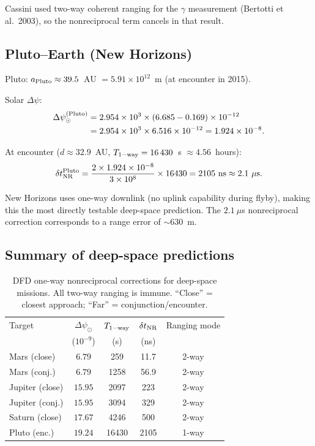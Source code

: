 \documentclass[aps,prl,twocolumn,superscriptaddress,showpacs]{revtex4-2}
\begin{document}
Cassini used two-way coherent ranging for the $\gamma$ measurement
(Bertotti et al.\ 2003), so the nonreciprocal term cancels in that
result.

\subsection{Pluto--Earth (New Horizons)}

Pluto: $a_{\rm Pluto} \approx 39.5$~AU $= 5.91\times 10^{12}$~m
(at encounter in 2015).

Solar $\Delta\psi$:
\begin{align}
\Delta\psi_\odot^{(\rm Pluto)} &= 2.954\times 10^3
\times(6.685 - 0.169)\times 10^{-12} \nonumber\\
&= 2.954\times 10^3\times 6.516\times 10^{-12}
= 1.924\times 10^{-8}.
\end{align}

At encounter ($d \approx 32.9$~AU, $T_{\rm 1-way} = 16\,430$~s
$\approx 4.56$~hours):
\begin{equation}
\delta t_{\rm NR}^{\rm Pluto} = \frac{2\times 1.924\times 10^{-8}}{3\times 10^8}
\times 16430 = 2105~\text{ns} \approx 2.1~\mu\text{s}.
\end{equation}

New Horizons uses one-way downlink (no uplink capability during
flyby), making this the most directly testable deep-space
prediction.  The $2.1~\mu$s nonreciprocal correction corresponds
to a range error of $\sim 630$~m.

\subsection{Summary of deep-space predictions}

\begin{table}[t]
\caption{DFD one-way nonreciprocal corrections for deep-space
missions.  All two-way ranging is immune.  ``Close'' = closest
approach; ``Far'' = conjunction/encounter.}
\label{tab:deep_space}
\begin{ruledtabular}
\begin{tabular}{lcccc}
Target & $\Delta\psi_\odot$ & $T_{\rm 1-way}$ & $\delta t_{\rm NR}$ & Ranging mode \\
 & ($10^{-9}$) & (s) & (ns) & \\
\hline
Mars (close) & $6.79$ & 259 & 11.7 & 2-way \\
Mars (conj.) & $6.79$ & 1258 & 56.9 & 2-way \\
Jupiter (close) & $15.95$ & 2097 & 223 & 2-way \\
Jupiter (conj.) & $15.95$ & 3094 & 329 & 2-way \\
Saturn (close) & $17.67$ & 4246 & 500 & 2-way \\
Pluto (enc.) & $19.24$ & 16430 & 2105 & 1-way \\
\end{tabular}
\end{ruledtabular}
\end{table}
\end{document}
